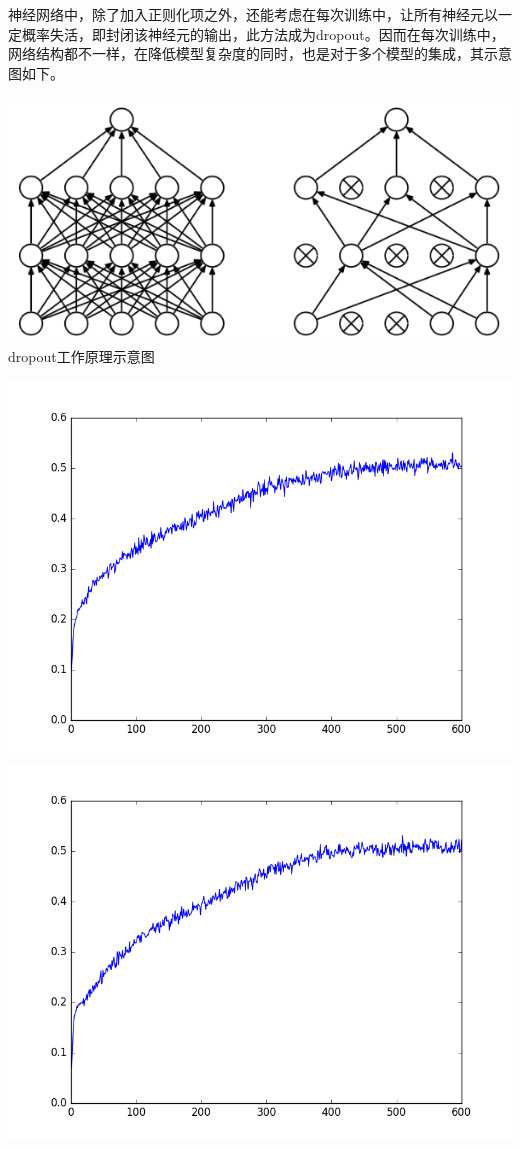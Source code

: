 神经网络中，除了加入正则化项之外，还能考虑在每次训练中，让所有神经元以一定概率失活，即封闭该神经元的输出，此方法成为dropout。因而在每次训练中，网络结构都不一样，在降低模型复杂度的同时，也是对于多个模型的集成，其示意图如下。
\begin{center}
\includegraphics[scale=0.5]{../figures/dropout.png} \\
dropout工作原理示意图
\end{center}
\begin{center}
\includegraphics[scale=0.5]{../figures/Log/BP_new1_3/BP_new1_3_acc.png} \\
\includegraphics[scale=0.5]{../figures/Log/BP_new1_4/BP_new1_4_acc.png} 
\end{center}
